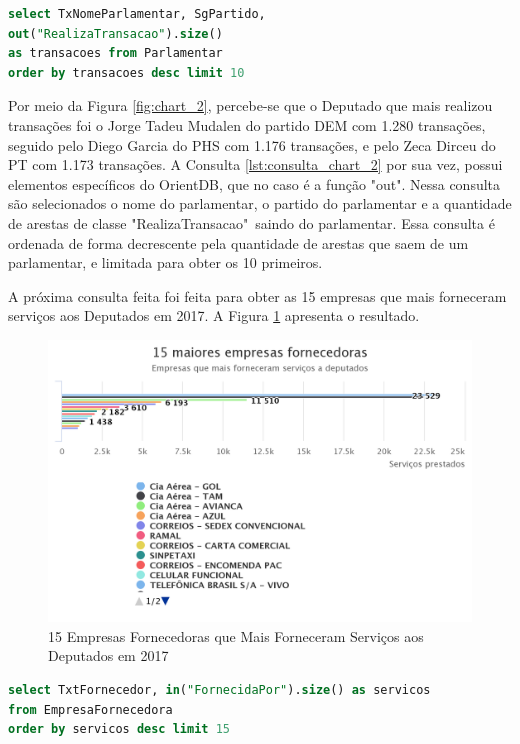 \documentclass[12pt]{article}
\begin{document}
\begin{lstlisting}[label={lst:consulta_chart_2}, caption={Consulta para o gráfico \ref{fig:chart_2}},captionpos=b, language=sql]
select TxNomeParlamentar, SgPartido, 
out("RealizaTransacao").size() 
as transacoes from Parlamentar 
order by transacoes desc limit 10
\end{lstlisting}

Por meio da Figura \ref{fig:chart_2}, percebe-se que o Deputado que mais realizou transações foi o Jorge Tadeu Mudalen do partido DEM com 1.280 transações, seguido pelo Diego Garcia do PHS com 1.176 transações, e pelo Zeca Dirceu do PT com 1.173 transações. A Consulta \ref{lst:consulta_chart_2} por sua vez, possui elementos específicos do OrientDB, que no caso é a função "out". Nessa consulta são selecionados o nome do parlamentar, o partido do parlamentar e a quantidade de arestas de classe "RealizaTransacao"\ saindo do parlamentar. Essa consulta é ordenada de forma decrescente pela quantidade de arestas que saem de um parlamentar, e limitada para obter os 10 primeiros.

A próxima consulta feita foi feita para obter as 15 empresas que mais forneceram serviços aos Deputados em 2017. A Figura \ref{fig:chart_3} apresenta o resultado.

\begin{figure}[ht]
\centering
\includegraphics[width=.6\textwidth]{chart_3.png}
\caption{15 Empresas Fornecedoras que Mais Forneceram Serviços aos Deputados em 2017}
\label{fig:chart_3}
\end{figure}

\begin{lstlisting}[label={lst:consulta_chart_3}, caption={Consulta para a Figura \ref{fig:chart_3}},captionpos=b, language=sql]
select TxtFornecedor, in("FornecidaPor").size() as servicos 
from EmpresaFornecedora 
order by servicos desc limit 15
\end{lstlisting}
\end{document}
